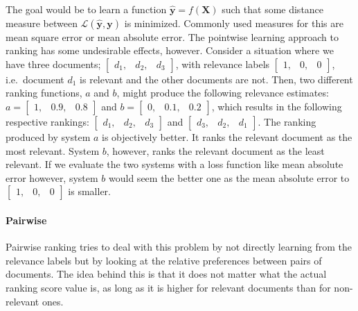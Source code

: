 The goal would be to learn a function $\mathbf{\hat y} = f(\mathbf{X})$ such that some distance measure between $\mathcal{L}\left(\mathbf{\hat y}, \mathbf{y} \right)$ is minimized. Commonly used measures for this are mean square error or mean absolute error. The pointwise learning approach to ranking has some undesirable effects, however. Consider a situation where we have three documents; 
$\left[
\begin{smallmatrix}
	d_1, & d_2, & d_3
\end{smallmatrix}
\right]$, with relevance labels
$\left[
\begin{smallmatrix}
	1, & 0, & 0
\end{smallmatrix}
\right]$, i.e.\ document $d_1$ is relevant and the other documents are not. Then, two different ranking functions, $a$ and $b$, might produce the following relevance estimates: 
$a = \left[
\begin{smallmatrix}
	1, & 0.9, & 0.8
\end{smallmatrix}
\right]$ 
and
$b = \left[
\begin{smallmatrix}
	0, & 0.1, & 0.2
\end{smallmatrix}
\right]$, which results in the following respective rankings:
$\left[
\begin{smallmatrix}
	d_1, & d_2, & d_3
\end{smallmatrix}
\right]$ 
and 
$\left[
\begin{smallmatrix}
	d_3, & d_2, & d_1
\end{smallmatrix}
\right]$. 
The ranking produced by system $a$ is objectively better. It ranks the relevant document as the most relevant. System $b$, however, ranks the relevant document as the least relevant. If we evaluate the two systems with a loss function like mean absolute error however, system $b$ would seem the better one as the mean absolute error to
$\left[
\begin{smallmatrix}
	1, & 0, & 0
\end{smallmatrix}
\right]$
is smaller. 

\paragraph{Pairwise} Pairwise ranking tries to deal with this problem by not directly learning from the relevance labels but by looking at the relative preferences between pairs of documents. The idea behind this is that it does not matter what the actual ranking score value is, as long as it is higher for relevant documents than for non-relevant ones.  

